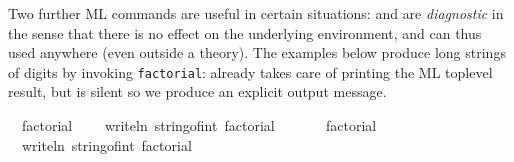 \begin{isabellebody}
\begin{isamarkuptext}
  \medskip Two further ML commands are useful in certain situations:
  \hyperlink{command.ML-val}{\mbox{}} and \hyperlink{command.ML-command}{\mbox{}} are
  \emph{diagnostic} in the sense that there is no effect on the
  underlying environment, and can thus used anywhere (even outside a
  theory).  The examples below produce long strings of digits by
  invoking \verb|factorial|: \hyperlink{command.ML-val}{\mbox{}} already takes care of
  printing the ML toplevel result, but \hyperlink{command.ML-command}{\mbox{}} is silent
  so we produce an explicit output message.%
\end{isamarkuptext}%
\isamarkuptrue%
%
\isadelimML
%
\endisadelimML
%
\isatagML
{}\isamarkupfalse%
\ {}\ factorial\ {}{}{}\ {}\isanewline
{}\isamarkupfalse%
\ {}\ writeln\ {}string{}of{}int\ {}factorial\ {}{}{}{}{}\ {}%
\endisatagML
{\isafoldML}%
%
\isadelimML
%
\endisadelimML
\isanewline
\isanewline
{}\isamarkupfalse%
\isanewline
%
\isadelimML
\ \ %
\endisadelimML
%
\isatagML
{}\isamarkupfalse%
\ {}\ factorial\ {}{}{}\ {}\ \ \isanewline
\ \ \isamarkupfalse%
\ {}\ writeln\ {}string{}of{}int\ {}factorial\ {}{}{}{}{}\ {}%

\end{isabellebody}
